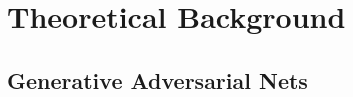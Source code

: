 \chapter{Theoretical Background}
\label{Theoretical Background}

\section*{Generative Adversarial Nets}